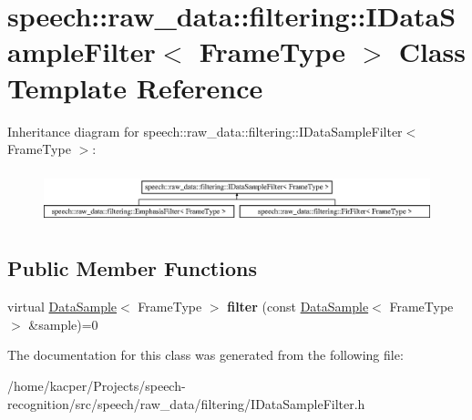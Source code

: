 \hypertarget{classspeech_1_1raw__data_1_1filtering_1_1IDataSampleFilter}{\section{speech\+:\+:raw\+\_\+data\+:\+:filtering\+:\+:I\+Data\+Sample\+Filter$<$ Frame\+Type $>$ Class Template Reference}
\label{classspeech_1_1raw__data_1_1filtering_1_1IDataSampleFilter}
}
Inheritance diagram for speech\+:\+:raw\+\_\+data\+:\+:filtering\+:\+:I\+Data\+Sample\+Filter$<$ Frame\+Type $>$\+:\begin{figure}[H]
\begin{center}
\leavevmode
\includegraphics[height=1.555556cm]{classspeech_1_1raw__data_1_1filtering_1_1IDataSampleFilter}
\end{center}
\end{figure}
\subsection*{Public Member Functions}
\begin{DoxyCompactItemize}
\item 
\hypertarget{classspeech_1_1raw__data_1_1filtering_1_1IDataSampleFilter_a4f4f5b84b49c48075e7b6f7072067312}{virtual \hyperlink{classspeech_1_1raw__data_1_1DataSample}{Data\+Sample}$<$ Frame\+Type $>$ {\bfseries filter} (const \hyperlink{classspeech_1_1raw__data_1_1DataSample}{Data\+Sample}$<$ Frame\+Type $>$ \&sample)=0}\label{classspeech_1_1raw__data_1_1filtering_1_1IDataSampleFilter_a4f4f5b84b49c48075e7b6f7072067312}

\end{DoxyCompactItemize}


The documentation for this class was generated from the following file\+:\begin{DoxyCompactItemize}
\item 
/home/kacper/\+Projects/speech-\/recognition/src/speech/raw\+\_\+data/filtering/I\+Data\+Sample\+Filter.\+h\end{DoxyCompactItemize}
